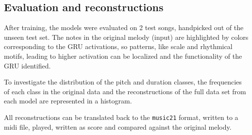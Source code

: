 \subsection{Evaluation and reconstructions}

After training, the models were evaluated on 2 test songs, handpicked out of the unseen test set. The notes in the original melody (input) are highlighted by colors corresponding to the GRU activations, so patterns, like scale and rhythmical motifs, leading to higher activation can be localized and the functionality of the GRU identified.

To investigate the distribution of the pitch and duration classes, the frequencies of each class in the original data and the reconstructions of the full data set from each model are represented in a histogram.

All reconstructions can be translated back to the \texttt{music21} format, written to a midi file, played, written as score and compared against the original melody.  




